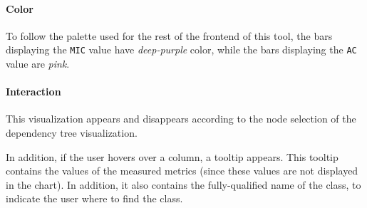\paragraph{Color}
To follow the palette used for the rest of the frontend of this tool, the bars displaying the \texttt{MIC} value have \textit{deep-purple} color, while the bars displaying the \texttt{AC} value are \textit{pink}.

\paragraph{Interaction}
This visualization appears and disappears according to the node selection of the dependency tree visualization.

In addition, if the user hovers over a column, a tooltip appears. This tooltip contains the values of the measured metrics (since these values are not displayed in the chart). In addition, it also contains the fully-qualified name of the class, to indicate the user where to find the class.
